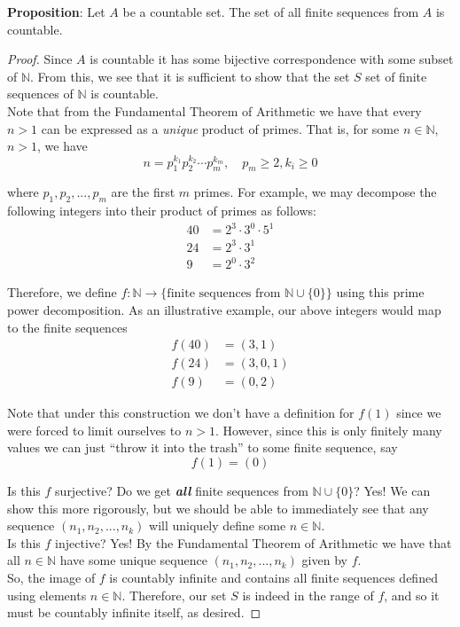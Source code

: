 \documentclass[12pt]{article}
\newlength\tindent
\renewcommand{\indent}{\hspace*{\tindent}}
\newcommand{\N}{\mathbb N}
\begin{document}
{\bf Proposition}: Let $A$ be a countable set. The set of all finite sequences from $A$ is countable. 

\begin{proof} Since $A$ is countable it has some bijective correspondence with some subset of $\N$. From this, we see that it is sufficient to show that the set $S$ set of finite sequences of $\N$ is countable. \\

\indent Note that from the Fundamental Theorem of Arithmetic we have that every $n > 1$ can be expressed as a {\em unique} product of primes. That is, for some $n \in \N$, $n > 1$, we have 
\begin{equation*}
	n = p_1^{k_1} p_2^{k_2} \cdots p_m^{k_m}, \quad p_m \geq 2, k_i \geq 0
\end{equation*}

where $p_1, p_2, ..., p_m$ are the first $m$ primes. For example, we may decompose the following integers into their product of primes as follows:
\begin{align*}
	40 &= 2^3 \cdot 3^0 \cdot 5^1 \\
	24 &= 2^3 \cdot 3^1 \\
	9 &= 2^0 \cdot 3^2
\end{align*}

\indent Therefore, we define $f:\N \to \{\text{finite sequences from $\N \cup \{0\}$}\}$ using this prime power decomposition. As an illustrative example, our above integers would map to the finite sequences
\begin{align*}
	f(40) &= (3, 1) \\
	f(24) &= (3, 0, 1) \\
	f(9) &= (0, 2)
\end{align*}

\indent Note that under this construction we don't have a definition for $f(1)$ since we were forced to limit ourselves to $n > 1$. However, since this is only finitely many values we can just ``throw it into the trash'' to some finite sequence, say
\begin{equation*}
	f(1) = (0)
\end{equation*}

\indent Is this $f$ surjective? Do we get {\em {\bf all}} finite sequences from $\N \cup \{0\}$? Yes! We can show this more rigorously, but we should be able to immediately see that any sequence $(n_1, n_2, ..., n_k)$ will uniquely define some $n \in \N$. \\

\indent Is this $f$ injective? Yes! By the Fundamental Theorem of Arithmetic we have that all $n \in \N$ have some unique sequence $(n_1, n_2, ..., n_k)$ given by $f$. \\

\indent So, the image of $f$ is countably infinite and contains all finite sequences defined using elements $n \in \N$. Therefore, our set $S$ is indeed in the range of $f$, and so it must be countably infinite itself, as desired.
\end{proof} \hfill\\
 
\end{document}

